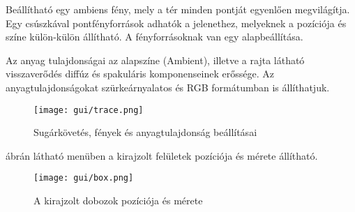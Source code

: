 Beállítható egy ambiens fény, mely a tér minden pontját egyenlően megvilágítja. Egy csúszkával pontfényforrások adhatók a jelenethez, melyeknek a pozíciója és színe külön-külön állítható. A fényforrásoknak van egy alapbeállítása.

Az anyag tulajdonságai az alapszíne (Ambient), illetve a rajta látható visszaverődés diffúz és spakuláris komponenseinek erőssége. Az anyagtulajdonságokat szürkeárnyalatos és RGB formátumban is állíthatjuk.

\begin{figure}[H]
	\centering
	\texttt{[image: gui/trace.png]}
	\caption{Sugárkövetés, fények és anyagtulajdonság beállításai}
	\label{fig:trace-settings}
\end{figure}

 ábrán látható menüben a kirajzolt felületek pozíciója és mérete állítható.

\begin{figure}[H]
	\centering
	\texttt{[image: gui/box.png]}
	\caption{A kirajzolt dobozok pozíciója és mérete}
	\label{fig:box-settings}
\end{figure}




